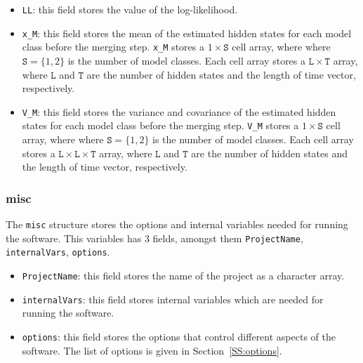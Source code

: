 \begin{itemize}
\item \lstinline[basicstyle = \mlttfamily \small ]!LL!: this field stores the value of the log-likelihood.
\item \lstinline[basicstyle = \mlttfamily \small ]!x_M!: this field stores the mean of the estimated hidden states for each model class before the merging step. \lstinline[basicstyle = \mlttfamily \small ]!x_M! stores a $1 \times \mathtt{S}$ cell array, where  where $\mathtt{S} = \{1,2 \}$ is the number of model classes. Each cell array stores a $\mathtt{L} \times \mathtt{T}$ array, where $\mathtt{L}$ and $\mathtt{T}$ are the number of hidden states and the length of time vector, respectively.
\item \lstinline[basicstyle = \mlttfamily \small ]!V_M!: this field stores the variance and covariance of the estimated hidden states for each model class before the merging step. \lstinline[basicstyle = \mlttfamily \small ]!V_M! stores a $1 \times \mathtt{S}$ cell array, where  where $\mathtt{S} = \{1,2 \}$ is the number of model classes. Each cell array stores a $\mathtt{L} \times  \mathtt{L} \times \mathtt{T}$ array, where $\mathtt{L}$ and $\mathtt{T}$ are the number of hidden states and the length of time vector, respectively.
\end{itemize}

\subsubsection{misc}
The \lstinline[basicstyle = \mlttfamily \small ]!misc! structure stores the options and internal variables needed for running the software.
This variables has 3 fields, amongst them \lstinline[basicstyle = \mlttfamily \small ]!ProjectName!, \lstinline[basicstyle = \mlttfamily \small ]!internalVars!, \lstinline[basicstyle = \mlttfamily \small ]!options!.

\begin{itemize}
\item \lstinline[basicstyle = \mlttfamily \small ]!ProjectName!: this field stores the name of the project as a character array.
\item \lstinline[basicstyle = \mlttfamily \small ]!internalVars!: this field stores internal variables which are needed for running the software.
\item \lstinline[basicstyle = \mlttfamily \small ]!options!: this field stores the options that control different aspects of the software. The list of options is given in Section~\ref{SS:options}.
\end{itemize}



